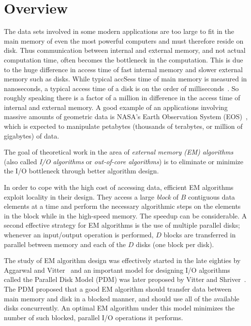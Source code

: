 \chapter{Overview}

The data sets involved in some modern applications are too large to
fit in the main memory of even the most powerful computers and must therefore
reside on disk. Thus communication between internal and external memory,
and not actual computation time, often becomes the bottleneck in the
computation. This is due to the huge difference in access time of fast
internal memory and slower external memory such as disks. While typical
accSess time of main memory is measured in nanoseconds, a typical access
time of a disk is on the order of milliseconds~\cite{cockcroft:sun}. So
roughly speaking there is a factor of a million in difference in the access
time of internal and external memory. A good example of an applications
involving massive amounts of geometric data is NASA's Earth Observation
System (EOS)~\cite{cromp,kobler:nasa}, which is expected to manipulate
petabytes (thousands of terabytes, or million of gigabytes) of data.

The goal of theoretical work in the area of {\em external
   memory (EM) algorithms\/} (also called {\em I/O
   algorithms\/} or {\em out-of-core algorithms}) is to
eliminate or minimize the I/O bottleneck through better
algorithm design.

In order to cope with the high cost of accessing data,
efficient EM algorithms exploit locality in their design.
They access a large \emph{block} of $B$ contiguous data
elements at a time and perform the necessary algorithmic
steps on the elements in the block while in the high-speed
memory. The speedup can be considerable.
A second effective strategy for EM algorithms is the use of
multiple parallel disks; whenever an input/output operation
is performed, $D$ blocks are transferred in parallel between
memory and each of the $D$ disks (one block per disk).

The study of EM algorithm design was effectively started in
the late eighties by Aggarwal and
Vitter~\cite{aggarwal:input} and an important model for
designing I/O algorithms called the Parallel Disk Model
(PDM) was later proposed by Vitter and
Shriver~\cite{vitter:algorithmsI}. The PDM proposed that a
good EM algorithm should transfer data between main memory
and disk in a blocked manner, and should use all of the
available disks concurrently. An optimal EM algorithm under
this model minimizes the number of such blocked, parallel
I/O operations it performs.
 
